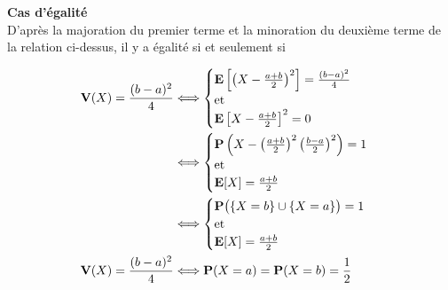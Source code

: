 \begin{solution}
    
    \textbf{Cas d'égalité}\\
    D'après la majoration du premier terme et la minoration du deuxième terme de la relation ci-dessus, il y a égalité  si et seulement si
    
    \begin{align*}
        \mathbf{V}(X) = \frac{(b-a)^2}{4} &\Longleftrightarrow
        \begin{cases}
            \mathbf{E} \left[ \left(X - \frac{a+b}{2} \right)^2 \right] = \frac{(b-a)^2}{4}\\
            \text{et}\\
            \mathbf{E} \left[X-\frac{a+b}{2} \right]^2 = 0
        \end{cases}\\
        &\Longleftrightarrow
        \begin{cases}
            \mathbf{P} \left( X - \left(\frac{a+b}{2} \right)^2  \left(\frac{b-a}{2} \right)^2 \right)= 1\\
            \text{et}\\
            \mathbf{E} [X] = \frac{a+b}{2}
        \end{cases}\\
        &\Longleftrightarrow
        \begin{cases}
            \mathbf{P} \big( \{ X=b \} \cup \{X=a\} \big)= 1\\
            \text{et}\\
            \mathbf{E} [X] = \frac{a+b}{2}
        \end{cases}\\
        \mathbf{V}(X) = \frac{(b-a)^2}{4} &\Longleftrightarrow \mathbf{P}(X=a)=\mathbf{P}(X=b)=\frac{1}{2}
    \end{align*}
\end{solution}

